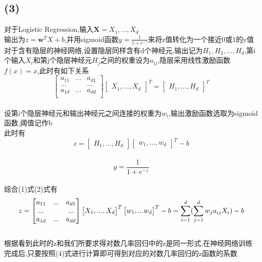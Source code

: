 \documentclass{article}
\begin{document}
\subsection*{(3)}\noindent
对于Logistic Regression,输入$\textbf{X}={X_1,...,X_d}$\\
输出为$z=\textbf{w}^TX+b$,并用sigmoid函数$y=\frac{1}{1+e^{-z}}$来将z值转化为一个接近0或1的y值\\
对于含有隐层的神经网络,设置隐层同样含有d个神经元,输出记为$H_1,H_2,...,H_d$,第i个输入$X_i$和第j个隐层神经元$H_j$之间的权重设为$a_{ij}$,隐层采用线性激励函数$f(x)=x$,此时有如下关系\\
\begin{equation}
	\begin{bmatrix}
	a_{11}&...&a_{d1}\\
	...&&...\\
	a_{1d}&...&a_{dd}\\
	\end{bmatrix}
	{\begin{bmatrix}
	X_1,...,X_d
	\end{bmatrix}}^T=
	\begin{bmatrix}
	H_1,...,H_d
	\end{bmatrix}^T
\end{equation}\\
设第i个隐层神经元和输出神经元之间连接的权重为$w_i$,输出激励函数选取为sigmoid函数,阈值记作b\\
此时有\\
\begin{equation}
	z=
	\begin{bmatrix}
	H_1,...,H_d
	\end{bmatrix}
	\begin{bmatrix}
	w_1,...,w_d
	\end{bmatrix}^T-b
\end{equation}\\
\begin{equation}
	y=\frac{1}{1+e^{-z}}
\end{equation}\\
综合(1)式(2)式有
\begin{equation}
z=
\begin{bmatrix}
	a_{11}&...&a_{d1}\\
...&&...\\
a_{1d}&...&a_{dd}\\
\end{bmatrix}
{\begin{bmatrix}
	X_1,...,X_d
	\end{bmatrix}}^T
\begin{bmatrix}
w_1,...w_d
\end{bmatrix}^T-b
\\=\sum_{i=1}^{d}(\sum_{j=1}^{d}w_ja_{ij}X_i)-b
\end{equation}\\
根据看到此时的z和我们所要求得对数几率回归中的z是同一形式,在神经网络训练完成后,只要按照(4)式进行计算即可得到对应的对数几率回归的z函数的系数
\end{document}
